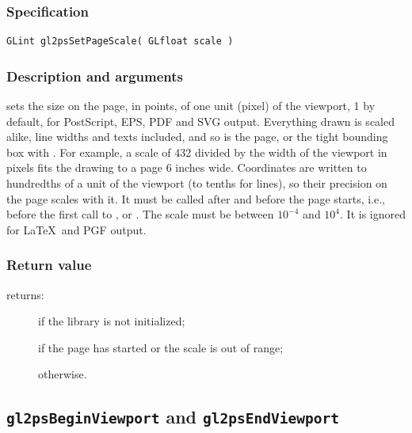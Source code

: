 \subsubsection{Specification}

\begin{verbatim}
GLint gl2psSetPageScale( GLfloat scale )
\end{verbatim}

\subsubsection{Description and arguments}

 sets the size on the page, in points, of one unit
(pixel) of the viewport, 1 by default, for PostScript, EPS, PDF and SVG
output. Everything drawn is scaled alike, line widths and texts
included, and so is the page, or the tight bounding box with
. For example, a scale of 432 divided by the
width of the viewport in pixels fits the drawing to a page 6 inches
wide. Coordinates are written to hundredths of a unit of the viewport (to
tenths for lines), so their precision on the page scales with it. It must
be called after  and before the page starts, i.e.,
before the first call to ,  or
. The scale must be between $10^{-4}$ and $10^4$. It is
ignored for \LaTeX\ and PGF output.

\subsubsection{Return value}

\noindent{} returns:
\begin{description}
\item[] if the library is not initialized;
\item[] if the page has started or the scale is out of
  range;
\item[] otherwise.
\end{description}


\subsection{\texttt{gl2psBeginViewport} and \texttt{gl2psEndViewport}}
\label{sec:gl2psBeginViewport}

